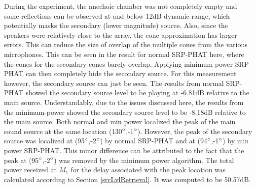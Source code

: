 During the experiment, the anechoic chamber was not completely empty and some reflections can be observed at and below 12dB dynamic range, which potentially masks the secondary (lower magnitude) source. Also, since the speakers were relatively close to the array, the cone approximation has larger errors. This can reduce the size of overlap of the multiple cones from the various microphones. This can be seen in the result for normal SRP-PHAT here, where the cones for the secondary cones barely overlap. Applying minimum power SRP-PHAT can then completely hide the secondary source. For this measurement however, the secondary source can just be seen. The results from normal SRP-PHAT showed the secondary source level to be playing at -6.81dB relative to the main source. Understandably, due to the issues discussed here, the results from the minimum-power showed the secondary source level to be -8.18dB relative to the main source. Both normal and min power localized the peak of the main sound source at the same location (130$\degree$,-1$\degree$). However, the peak of the secondary source was localized at (95$\degree$,-2$\degree$) by normal SRP-PHAT and at (94$\degree$,-1$\degree$) by min power SRP-PHAT. This minor difference can be attributed to the fact that the peak at (95$\degree$,-2$\degree$) was removed by the minimum power algorithm. The total power received at $M_1$ for the delay associated with the peak location was calculated according to Section \ref{srcLvlRetrieval}. It was computed to be 50.57dB.

%
